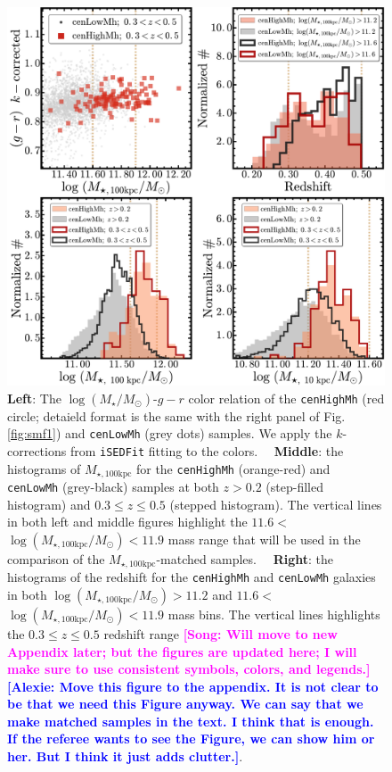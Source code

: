 \documentclass{emulateapj}
\def\rbcg{\texttt{cenHighMh}}
\def\nbcg{\texttt{cenLowMh}}
\def\logms{{$\log (M_{\star}/M_{\odot})$}}
\def\mtot{{$M_{\star,100\mathrm{kpc}}$}}
\def\logmtot{{$\log (M_{\star,100\mathrm{kpc}}/M_{\odot})$}}
\newcommand{\song}[1]{\textcolor{magenta}{\textbf{[Song: #1]}}}
\newcommand{\alexie}[1]{\textcolor{blue}{\textbf{[Alexie: #1]}}}
\begin{document}
\begin{CJK*}{UTF8}{gbsn}
  \begin{figure}[t!]
      \centering 
      \includegraphics[width=\textwidth]{fig/redbcg_sample_stats}
      \caption{\textbf{Left}: The \logms{}-$g-r$ color relation of the \rbcg{} 
          (red circle; detaield format is the same with the right panel of 
          Fig.\ref{fig:smf1}) and \nbcg{} (grey dots) samples.
          We apply the $k$-corrections from \texttt{iSEDFit} fitting to the colors.~~
          \textbf{Middle}: the histograms of \mtot{} for the \rbcg{} (orange-red) and 
          \nbcg{} (grey-black) samples at both $z>0.2$ (step-filled histogram) and 
          $0.3 \leq z \leq 0.5$ (stepped histogram). 
          The vertical lines in both left and middle figures highlight the 
          $11.6<$\logmtot{}$<11.9$ mass range that will be used in the comparison of 
          the \mtot{}-matched samples.~~
          \textbf{Right}: the histograms of the redshift for the \rbcg{} and 
          \nbcg{} galaxies in both \logmtot$>11.2$ and $11.6<$\logmtot{}$<11.9$
          mass bins.
          The vertical lines highlights the $0.3\leq z \leq 0.5$ redshift range 
          \song{Will move to new Appendix later; but the figures are updated here; 
          I will make sure to use consistent symbols, colors, and legends.}
          \alexie{Move this figure to the appendix. It is not clear to be that we need this Figure anyway. We can say that we make matched samples in the text. I think that is enough. If the referee wants to see the Figure, we can show him or her. But I think it just adds clutter.}.
      }
      \label{fig:sample_stats}
  \end{figure}
    

\end{CJK*}
\end{document}

